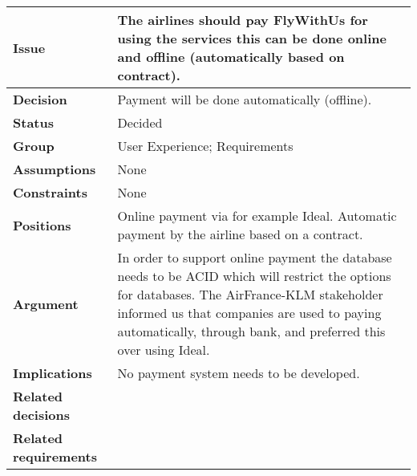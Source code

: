 
\begin{tabular}{ l  p{10cm}}
\hline
\bf Issue & The airlines should pay FlyWithUs for using the services this can be done online and offline (automatically based on contract).\\
\hline
\bf Decision & Payment will be done automatically (offline).\\
\hline
\bf Status & Decided\\
\hline
\bf Group & User Experience;  Requirements \\
\hline
\bf Assumptions & None\\
\hline
\bf Constraints & None \\
\hline
\bf Positions & Online payment via for example Ideal. \newline\newline
Automatic payment by the airline based on a contract.
 \\
\hline
\bf Argument & In order to support online payment the database needs to be ACID which will restrict the options for databases. The AirFrance-KLM stakeholder informed us that companies are used to paying automatically, through bank, and preferred this over using Ideal. \\
\hline
\bf Implications & No payment system needs to be developed. \\
\hline
\bf Related decisions & \\
\hline
\bf Related requirements  & \\
\hline
\end{tabular}
